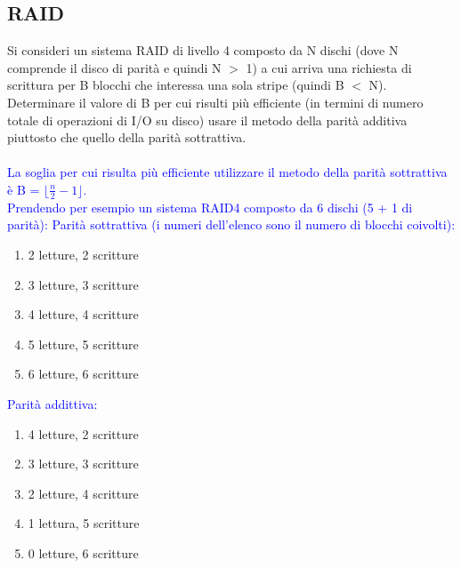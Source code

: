 \documentclass[12pt]{article}
\begin{document}
\subsection{RAID}
Si consideri un sistema RAID di livello 4 composto da N dischi (dove N comprende il disco di parità e quindi N $>$ 1) a cui arriva una richiesta di scrittura per B blocchi che interessa una sola stripe
(quindi B $<$ N). Determinare il valore di B per cui risulti più efficiente (in termini di numero totale di operazioni di I/O su disco) usare il metodo della parità additiva piuttosto che quello della parità sottrattiva.\\\\
\textcolor{blue}{La soglia per cui risulta più efficiente utilizzare il metodo della parità sottrattiva è B = $\lfloor \frac{n}{2}-1 \rfloor$.\\
Prendendo per esempio un sistema RAID4 composto da 6 dischi (5 + 1 di parità):
Parità sottrattiva (i numeri dell'elenco sono il numero di blocchi coivolti):}
\begin{enumerate}
    \color{blue}
    \item 2 letture, 2 scritture
    \item 3 letture, 3 scritture
    \item 4 letture, 4 scritture
    \item 5 letture, 5 scritture
    \item 6 letture, 6 scritture
\end{enumerate}
\textcolor{blue}{Parità addittiva:}
\begin{enumerate}
    \color{blue}
    \item 4 letture, 2 scritture
    \item 3 letture, 3 scritture
    \item 2 letture, 4 scritture
    \item 1 lettura, 5 scritture
    \item 0 letture, 6 scritture
\end{enumerate}
\end{document}
